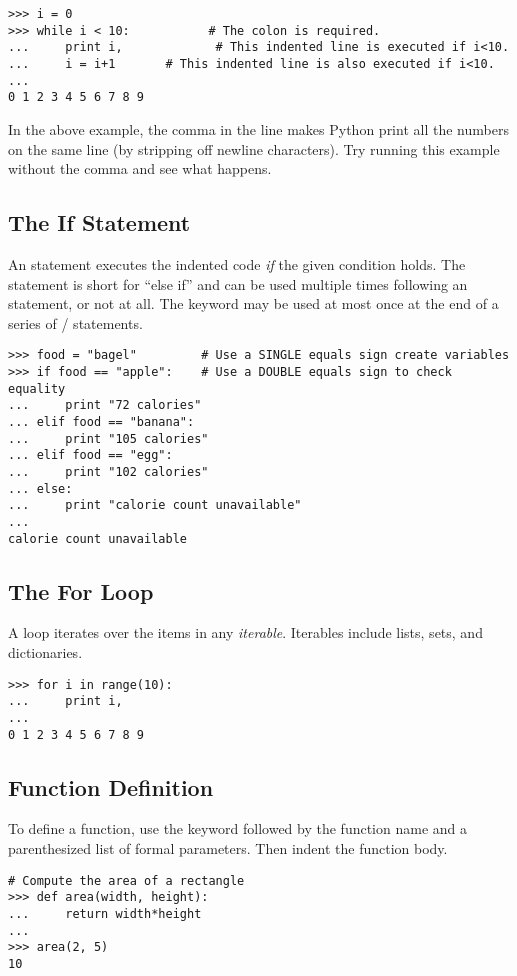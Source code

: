 \begin{lstlisting}
>>> i = 0
>>> while i < 10:           # The colon is required.
...     print i,             # This indented line is executed if i<10.
...     i = i+1       # This indented line is also executed if i<10.
...     
0 1 2 3 4 5 6 7 8 9
\end{lstlisting}
In the above example, the comma in the line  makes Python print all the numbers on the same line (by stripping off newline characters). Try running this example without the comma and see what happens.


\subsection*{The If Statement}
An  statement executes the 
indented code \emph{if} the given condition holds.
The  statement is short for ``else if'' and can be used multiple times following an  statement, or not at all. 
The  keyword may be used at most once at the end of a series of / statements.
\begin{lstlisting}
>>> food = "bagel"         # Use a SINGLE equals sign create variables
>>> if food == "apple":    # Use a DOUBLE equals sign to check equality
...     print "72 calories"
... elif food == "banana":
...     print "105 calories"
... elif food == "egg":
...     print "102 calories"
... else: 
...     print "calorie count unavailable"
...     
calorie count unavailable
\end{lstlisting}


\subsection*{The For Loop}
A  loop iterates over the items in any \emph{iterable}. Iterables include lists, sets, and dictionaries.

\begin{lstlisting}
>>> for i in range(10):
...     print i,
...     
0 1 2 3 4 5 6 7 8 9
\end{lstlisting}


\subsection*{Function Definition}
To define a function, use the  keyword followed by the function name and a parenthesized list of formal parameters. Then indent the function body.
\begin{lstlisting}
# Compute the area of a rectangle
>>> def area(width, height):
...     return width*height
...         
>>> area(2, 5)
10
\end{lstlisting}

